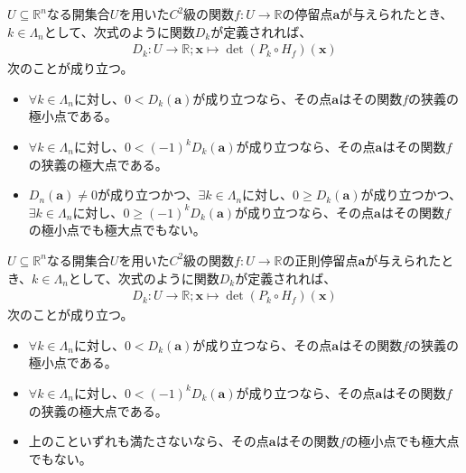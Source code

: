 \documentclass[dvipdfmx]{jsarticle}
\begin{document}
\begin{thm*}
$U \subseteq \mathbb{R}^{n}$なる開集合$U$を用いた$C^{2}$級の関数$f:U \rightarrow \mathbb{R}$の停留点$\mathbf{a}$が与えられたとき、$k \in \varLambda_{n}$として、次式のように関数$D_{k}$が定義されれば、
\begin{align*}
D_{k}:U \rightarrow \mathbb{R};\mathbf{x} \mapsto \det{\left( P_{k} \circ H_{f} \right)\left( \mathbf{x} \right)}
\end{align*}
次のことが成り立つ。
\begin{itemize}
\item
  $\forall k \in \varLambda_{n}$に対し、$0 < D_{k}\left( \mathbf{a} \right)$が成り立つなら、その点$\mathbf{a}$はその関数$f$の狭義の極小点である。
\item
  $\forall k \in \varLambda_{n}$に対し、$0 < ( - 1)^{k}D_{k}\left( \mathbf{a} \right)$が成り立つなら、その点$\mathbf{a}$はその関数$f$の狭義の極大点である。
\item
  $D_{n}\left( \mathbf{a} \right) \neq 0$が成り立つかつ、$\exists k \in \varLambda_{n}$に対し、$0 \geq D_{k}\left( \mathbf{a} \right)$が成り立つかつ、$\exists k \in \varLambda_{n}$に対し、$0 \geq ( - 1)^{k}D_{k}\left( \mathbf{a} \right)$が成り立つなら、その点$\mathbf{a}$はその関数$f$の極小点でも極大点でもない。
\end{itemize}
\end{thm*}
\begin{thm*}
$U \subseteq \mathbb{R}^{n}$なる開集合$U$を用いた$C^{2}$級の関数$f:U \rightarrow \mathbb{R}$の正則停留点$\mathbf{a}$が与えられたとき、$k \in \varLambda_{n}$として、次式のように関数$D_{k}$が定義されれば、
\begin{align*}
D_{k}:U \rightarrow \mathbb{R};\mathbf{x} \mapsto \det{\left( P_{k} \circ H_{f} \right)\left( \mathbf{x} \right)}
\end{align*}
次のことが成り立つ。
\begin{itemize}
\item
  $\forall k \in \varLambda_{n}$に対し、$0 < D_{k}\left( \mathbf{a} \right)$が成り立つなら、その点$\mathbf{a}$はその関数$f$の狭義の極小点である。
\item
  $\forall k \in \varLambda_{n}$に対し、$0 < ( - 1)^{k}D_{k}\left( \mathbf{a} \right)$が成り立つなら、その点$\mathbf{a}$はその関数$f$の狭義の極大点である。
\item
  上のこといずれも満たさないなら、その点$\mathbf{a}$はその関数$f$の極小点でも極大点でもない。
\end{itemize}
\end{thm*}
\end{document}
